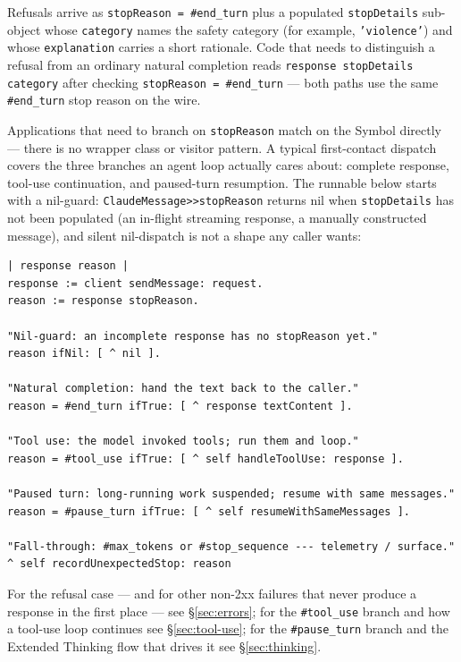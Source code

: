 \documentclass[a4paper,10pt,fleqn]{article}
\begin{document}
Refusals arrive as \texttt{stopReason = \#end\_turn} plus a
populated \texttt{stopDetails} sub-object whose \texttt{category}
names the safety category (for example,
\texttt{'violence'}) and whose \texttt{explanation} carries a
short rationale.  Code that needs to distinguish a refusal from an
ordinary natural completion reads \texttt{response stopDetails
category} after checking \texttt{stopReason = \#end\_turn} ---
both paths use the same \texttt{\#end\_turn} stop reason on the
wire.

Applications that need to branch on \texttt{stopReason} match on
the Symbol directly --- there is no wrapper class or visitor
pattern.  A typical first-contact dispatch covers the three
branches an agent loop actually cares about: complete response,
tool-use continuation, and paused-turn resumption.  The runnable
below starts with a nil-guard: \texttt{ClaudeMessage>>stopReason}
returns nil when \texttt{stopDetails} has not been populated (an
in-flight streaming response, a manually constructed message),
and silent nil-dispatch is not a shape any caller wants:

\begin{lstlisting}[language={},title={Dispatch on stopReason}]
| response reason |
response := client sendMessage: request.
reason := response stopReason.

"Nil-guard: an incomplete response has no stopReason yet."
reason ifNil: [ ^ nil ].

"Natural completion: hand the text back to the caller."
reason = #end_turn ifTrue: [ ^ response textContent ].

"Tool use: the model invoked tools; run them and loop."
reason = #tool_use ifTrue: [ ^ self handleToolUse: response ].

"Paused turn: long-running work suspended; resume with same messages."
reason = #pause_turn ifTrue: [ ^ self resumeWithSameMessages ].

"Fall-through: #max_tokens or #stop_sequence --- telemetry / surface."
^ self recordUnexpectedStop: reason
\end{lstlisting}

For the refusal case --- and for other non-2xx failures that
never produce a response in the first place --- see
\S\ref{sec:errors}; for the \texttt{\#tool\_use} branch and how a
tool-use loop continues see \S\ref{sec:tool-use}; for the
\texttt{\#pause\_turn} branch and the Extended Thinking flow that
drives it see \S\ref{sec:thinking}.

\medskip
{}
\end{document}
